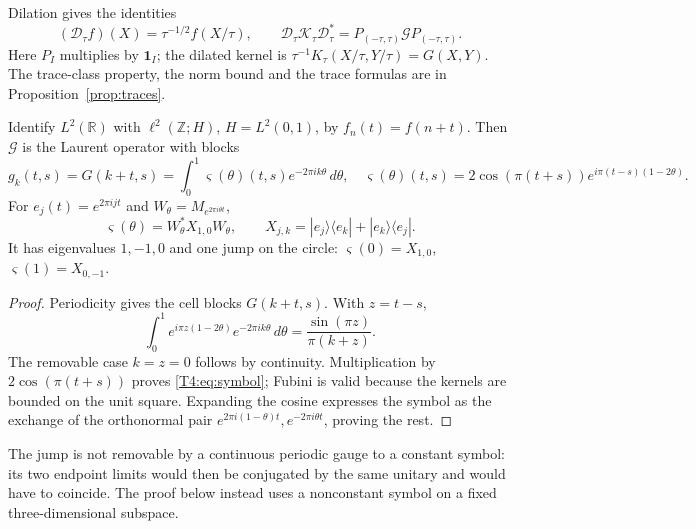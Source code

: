 Dilation gives the identities
\[
 (\mathcal D_\tau f)(X)=\tau^{-1/2}f(X/\tau),\qquad
 \mathcal D_\tau\mathcal K_\tau\mathcal D_\tau^*
 =P_{(-\tau,\tau)}\mathcal G P_{(-\tau,\tau)}.
\]
Here $P_I$ multiplies by $\mathbf1_I$; the dilated kernel is
$\tau^{-1}K_\tau(X/\tau,Y/\tau)=G(X,Y)$.
The trace-class property, the norm bound and the trace formulas are in
Proposition~\ref{prop:traces}.

\begin{proposition}\label{T4:prop:bloch}
Identify $L^2(\mathbb R)$ with $\ell^2(\mathbb Z;H)$, $H=L^2(0,1)$,
by $f_n(t)=f(n+t)$.  Then $\mathcal G$ is the Laurent operator with blocks
\begin{equation}\label{T4:eq:symbol}
 g_k(t,s)=G(k+t,s)=\int_0^1\varsigma(\theta)(t,s)e^{-2\pi ik\theta}\,d\theta,
 \quad
 \varsigma(\theta)(t,s)=2\cos(\pi(t+s))e^{i\pi(t-s)(1-2\theta)}.
\end{equation}
For $e_j(t)=e^{2\pi ijt}$ and $W_\theta=M_{e^{2\pi i\theta t}}$,
\[
 \varsigma(\theta)=W_\theta^*X_{1,0}W_\theta,
 \qquad X_{j,k}=|e_j\rangle\langle e_k|+|e_k\rangle\langle e_j|.
\]
It has eigenvalues $1,-1,0$ and one jump on the circle:
$\varsigma(0)=X_{1,0}$, $\varsigma(1)=X_{0,-1}$.
\end{proposition}
\begin{proof}
Periodicity gives the cell blocks $G(k+t,s)$.  With $z=t-s$,
\[
 \int_0^1e^{i\pi z(1-2\theta)}e^{-2\pi ik\theta}\,d\theta
 =\frac{\sin(\pi z)}{\pi(k+z)}.
\]
The removable case $k=z=0$ follows by continuity.  Multiplication by
$2\cos(\pi(t+s))$ proves \eqref{T4:eq:symbol}; Fubini is valid because
the kernels are bounded on the unit square.  Expanding the cosine
expresses the symbol as the exchange of the orthonormal pair
$e^{2\pi i(1-\theta)t},e^{-2\pi i\theta t}$, proving the rest.
\end{proof}
The jump is not removable by a continuous periodic gauge to a constant
symbol: its two endpoint limits would then be conjugated by the same
unitary and would have to coincide.  The proof below instead uses a
nonconstant symbol on a fixed three-dimensional subspace.


